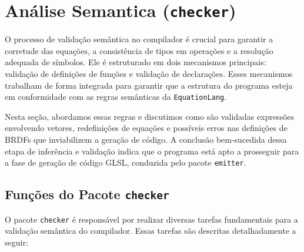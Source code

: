 
\section{Análise Semantica (\texttt{checker})} \label{section-checker}
O processo de validação semântica no compilador é crucial para garantir a corretude das equações, a consistência de tipos em operações e a resolução adequada de símbolos. Ele é estruturado em dois mecanismos principais: validação de definições de funções e validação de declarações. Esses mecanismos trabalham de forma integrada para garantir que a estrutura do programa esteja em conformidade com as regras semânticas da \texttt{EquationLang}.

Nesta seção, abordamos essas regras e discutimos como são validadas expressões envolvendo vetores, redefinições de equações e possíveis erros nas definições de BRDFs que inviabilizem a geração de código. A conclusão bem-sucedida dessa etapa de inferência e validação indica que o programa está apto a prosseguir para a fase de geração de código GLSL, conduzida pelo pacote \texttt{emitter}.


\subsection{Funções do Pacote \texttt{checker}}

O pacote \texttt{checker} é responsável por realizar diversas tarefas fundamentais para a validação semântica do compilador. Essas tarefas são descritas detalhadamente a seguir:

